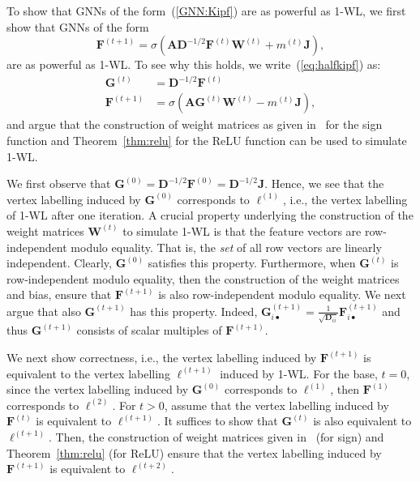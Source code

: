 To show that GNNs of the form~(\ref{GNN:Kipf}) are as powerful as 1-WL,
we first show that GNNs
of the form 
\begin{equation}\label{eq:halfkipf}
    \mathbf{F}^{(t+1)} = \sigma\left(
        \mathbf{A}\mathbf{D}^{-1/2}
        \mathbf{F}^{(t)}\mathbf{W}^{(t)} + m^{(t)}\mathbf{J}
    \right),
\end{equation}
are as powerful as 1-WL.  To see why this holds,   we write~(\ref{eq:halfkipf}) as:
\begin{align*}
\mathbf{G}^{(t)} &= \mathbf{D}^{-1/2}\mathbf{F}^{(t)}\\
\mathbf{F}^{(t+1)} &= \sigma\left(
    \mathbf{A}\mathbf{G}^{(t)}\mathbf{W}^{(t)} - m^{(t)}\mathbf{J}  \right),
\end{align*}    
and argue that the construction of weight matrices as given in~\cite{grohewl} for the sign function and Theorem~\ref{thm:relu} for the ReLU function can be used to simulate 1-WL.

We first observe that $\mathbf{G}^{(0)}=\mathbf{D}^{-1/2}\mathbf{F}^{(0)}=\mathbf{D}^{-1/2}\mathbf{J}$. 
Hence, we see that 
the vertex labelling induced by $\mathbf{G}^{(0)}$ corresponds to $\ell^{(1)}$, i.e., the vertex labelling of 1-WL after one iteration. A crucial property underlying the construction of the weight matrices $\mathbf{W}^{(t)}$ to simulate 1-WL is that the feature vectors are row-independent modulo equality. That is, the \textit{set} of all row vectors  are linearly independent. 
Clearly, $\mathbf{G}^{(0)}$ satisfies this property. Furthermore, when $\mathbf{G}^{(t)}$ is row-independent modulo equality, then the 
construction of the weight matrices and bias, ensure that $\mathbf{F}^{(t+1)}$ is also row-independent modulo equality. We next argue that
also $\mathbf{G}^{(t+1)}$ has this property. Indeed, $\mathbf{G}^{(t+1)}_{i\bullet}=\frac{1}{\sqrt{\mathbf{D}_{ii}}} \mathbf{F}^{(t+1)}_{i\bullet}$ and thus $\mathbf{G}^{(t+1)}$ consists of scalar multiples of $\mathbf{F}^{(t+1)}$.

We next show correctness, i.e., the vertex labelling induced by $\mathbf{F}^{(t+1)}$  is equivalent to the vertex labelling $\ell^{(t+1)}$ induced by 1-WL.
For the base, $t=0$, since the vertex labelling induced by  $\mathbf{G}^{(0)}$ corresponds to $\ell^{(1)}$, then $\mathbf{F}^{(1)}$ corresponds to $\ell^{(2)}$. For $t>0$, assume that the vertex labelling induced by $\mathbf{F}^{(t)}$ is equivalent to $\ell^{(t+1)}$. It suffices to show that 
$\mathbf{G}^{(t)}$ is also equivalent to $\ell^{(t+1)}$. Then, the construction of weight matrices given in~\cite{grohewl} (for sign) and Theorem~\ref{thm:relu} (for ReLU) ensure that the vertex labelling induced by $\mathbf{F}^{(t+1)}$ is equivalent to $\ell^{(t+2)}$.

